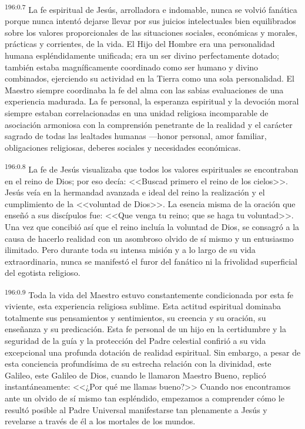 \par 
\textsuperscript{196:0.7} La fe espiritual de Jesús, arrolladora e indomable, nunca se volvió fanática porque nunca intentó dejarse llevar por sus juicios intelectuales bien equilibrados sobre los valores proporcionales de las situaciones sociales, económicas y morales, prácticas y corrientes, de la vida. El Hijo del Hombre era una personalidad humana espléndidamente unificada; era un ser divino perfectamente dotado; también estaba magníficamente coordinado como ser humano y divino combinados, ejerciendo su actividad en la Tierra como una sola personalidad. El Maestro siempre coordinaba la fe del alma con las sabias evaluaciones de una experiencia madurada. La fe personal, la esperanza espiritual y la devoción moral siempre estaban correlacionadas en una unidad religiosa incomparable de asociación armoniosa con la comprensión penetrante de la realidad y el carácter sagrado de todas las lealtades humanas ---honor personal, amor familiar, obligaciones religiosas, deberes sociales y necesidades económicas.

\par 
\textsuperscript{196:0.8} La fe de Jesús visualizaba que todos los valores espirituales se encontraban en el reino de Dios; por eso decía: <<Buscad primero el reino de los cielos>>. Jesús veía en la hermandad avanzada e ideal del reino la realización y el cumplimiento de la <<voluntad de Dios>>. La esencia misma de la oración que enseñó a sus discípulos fue: <<Que venga tu reino; que se haga tu voluntad>>. Una vez que concibió así que el reino incluía la voluntad de Dios, se consagró a la causa de hacerlo realidad con un asombroso olvido de sí mismo y un entusiasmo ilimitado. Pero durante toda su intensa misión y a lo largo de su vida extraordinaria, nunca se manifestó el furor del fanático ni la frivolidad superficial del egotista religioso.

\par 
\textsuperscript{196:0.9} Toda la vida del Maestro estuvo constantemente condicionada por esta fe viviente, esta experiencia religiosa sublime. Esta actitud espiritual dominaba totalmente sus pensamientos y sentimientos, su creencia y su oración, su enseñanza y su predicación. Esta fe personal de un hijo en la certidumbre y la seguridad de la guía y la protección del Padre celestial confirió a su vida excepcional una profunda dotación de realidad espiritual. Sin embargo, a pesar de esta conciencia profundísima de su estrecha relación con la divinidad, este Galileo, este Galileo de Dios, cuando le llamaron Maestro Bueno, replicó instantáneamente: <<¿Por qué me llamas bueno?>> Cuando nos encontramos ante un olvido de sí mismo tan espléndido, empezamos a comprender cómo le resultó posible al Padre Universal manifestarse tan plenamente a Jesús y revelarse a través de él a los mortales de los mundos.

